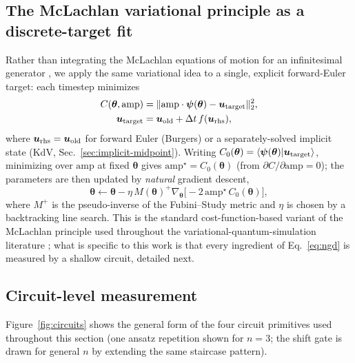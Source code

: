 \documentclass[aps,pra,twocolumn,notitlepage,superscriptaddress,floatfix,10pt]{revtex4-2}
\renewcommand{\braket}[2]{\langle #1 \vert #2 \rangle}
\newcommand{\norm}[1]{\lVert #1 \rVert}
\begin{document}
\subsection{The McLachlan variational principle as a discrete-target fit}
Rather than integrating the McLachlan equations of motion for an infinitesimal generator
\cite{McLachlan1964,Li2017,Yuan2019}, we apply the same variational idea to a single, explicit
forward-Euler target: each timestep minimizes
\begin{align}
C(\bm\theta,\mathrm{amp}) &= \norm{\mathrm{amp}\cdot\bm\psi(\bm\theta)-\bm u_{\rm target}}_2^2,\\
\bm u_{\rm target}&=\bm u_{\rm old}+\Delta t\,f(\bm u_{\rm rhs}),
\label{eq:cost}
\end{align}
where $\bm u_{\rm rhs}=\bm u_{\rm old}$ for forward Euler (Burgers) or a separately-solved implicit
state (KdV, Sec.~\ref{sec:implicit-midpoint}). Writing $C_0(\bm\theta)=\braket{\bm\psi(\bm\theta)}
{\bm u_{\rm target}}$, minimizing over $\mathrm{amp}$ at fixed $\bm\theta$ gives
$\mathrm{amp}^\star=C_0(\bm\theta)$ (from $\partial C/\partial\mathrm{amp}=0$); the parameters are
then updated by \emph{natural} gradient descent,
\begin{equation}
\bm\theta\leftarrow\bm\theta-\eta\,M(\bm\theta)^{+}\nabla_{\bm\theta}\big[-2\,\mathrm{amp}^\star\,
C_0(\bm\theta)\big],
\label{eq:ngd}
\end{equation}
where $M^+$ is the pseudo-inverse of the Fubini--Study metric and $\eta$ is chosen by a backtracking
line search. This is the standard cost-function-based variant of the McLachlan principle used
throughout the variational-quantum-simulation literature \cite{Yuan2019}; what is specific to this
work is that every ingredient of Eq.~\eqref{eq:ngd} is measured by a shallow circuit, detailed next.

\subsection{Circuit-level measurement}
\label{sec:circuit-measurement}
Figure~\ref{fig:circuits} shows the general form of the four circuit primitives used throughout this
section (one ansatz repetition shown for $n=3$; the shift gate is drawn for general $n$ by extending
the same staircase pattern).
\end{document}

